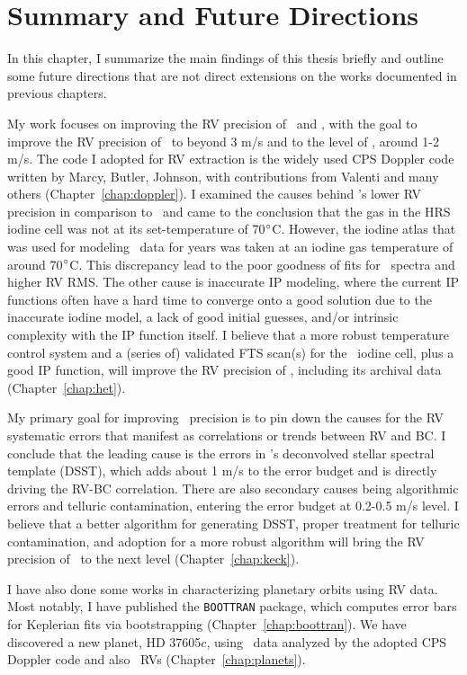 \chapter{Summary and Future Directions}\label{chap:conclusion}

In this chapter, I summarize the main findings of this thesis briefly
and outline some future directions that are not direct extensions on the
works documented in previous chapters.

My work focuses on improving the RV precision of \het\ and \keck, with
the goal to improve the RV precision of \het\ to beyond 3 m/s and to
the level of \keck, around 1-2 m/s. The code I adopted for RV
extraction is the widely used CPS Doppler code written by Marcy,
Butler, Johnson, with contributions from Valenti and many others
(Chapter~\ref{chap:doppler}). I examined the causes behind \het's
lower RV precision in comparison to \keck\ and came to the conclusion
that the gas in the HRS iodine cell was not at its set-temperature of
70$^{\circ}$C. However, the iodine atlas that was used for modeling
\het\ data for years was taken at an iodine gas temperature of around
70$^{\circ}$C. This discrepancy lead to the poor goodness of fits for
\het\ spectra and higher RV RMS. The other cause is inaccurate IP
modeling, where the current IP functions often have a hard time to
converge onto a good solution due to the inaccurate iodine model, a
lack of good initial guesses, and/or intrinsic complexity with the IP
function itself. I believe that a more robust temperature control
system and a (series of) validated FTS scan(s) for the \het\ iodine
cell, plus a good IP function, will improve the RV precision of \het,
including its archival data (Chapter~\ref{chap:het}).

My primary goal for improving \keck\ precision is to pin down the
causes for the RV systematic errors that manifest as correlations or
trends between RV and BC. I conclude that the leading cause is the
errors in \keck's deconvolved stellar spectral template (DSST), which
adds about 1 m/s to the error budget and is directly driving the RV-BC
correlation. There are also secondary causes being algorithmic errors
and telluric contamination, entering the error budget at 0.2-0.5 m/s
level. I believe that a better algorithm for generating DSST, proper
treatment for telluric contamination, and adoption for a more robust
algorithm will bring the RV precision of \keck\ to the next level
(Chapter~\ref{chap:keck}). 

I have also done some works in characterizing planetary orbits using
RV data. Most notably, I have published the {\tt BOOTTRAN} package,
which computes error bars for Keplerian fits via bootstrapping
(Chapter~\ref{chap:boottran}). We have discovered a new planet, HD
37605$c$, using \het\ data analyzed by the adopted CPS Doppler code
and also \keck\ RVs (Chapter~\ref{chap:planets}).

